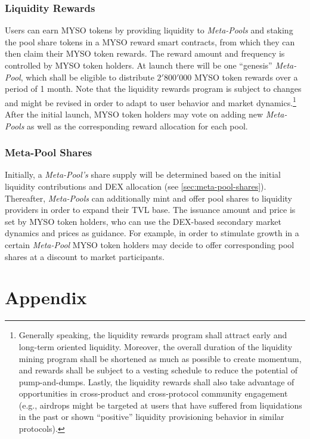 \documentclass[a4paper]{article}
\begin{document}
\subsubsection{Liquidity Rewards}
Users can earn MYSO tokens by providing liquidity to \emph{Meta-Pools} and staking the pool share tokens in a MYSO reward smart contracts, from which they can then claim their MYSO token rewards. The reward amount and frequency is controlled by MYSO token holders. At launch there will be one ``genesis'' \emph{Meta-Pool}, which shall be eligible to distribute $2'800'000$ MYSO token rewards over a period of 1 month. Note that the liquidity rewards program is subject to changes and might be revised in order to adapt to user behavior and market dynamics.\footnote{Generally speaking, the liquidity rewards program shall attract early and long-term oriented liquidity. Moreover, the overall duration of the liquidity mining program shall be shortened as much as possible to create momentum, and rewards shall be subject to a vesting schedule to reduce the potential of pump-and-dumps. Lastly, the liquidity rewards shall also take advantage of opportunities in cross-product and cross-protocol community engagement (e.g., airdrops might be targeted at users that have suffered from liquidations in the past or shown ``positive'' liquidity provisioning behavior in similar protocols).} After the initial launch, MYSO token holders may vote on adding new \emph{Meta-Pools} as well as the corresponding reward allocation for each pool.

\subsubsection{Meta-Pool Shares}
Initially, a \emph{Meta-Pool's} share supply will be determined based on the initial liquidity contributions and DEX allocation (see \cref{sec:meta-pool-shares}). Thereafter, \emph{Meta-Pools} can additionally mint and offer pool shares to liquidity providers in order to expand their TVL base. The issuance amount and price is set by MYSO token holders, who can use the DEX-based secondary market dynamics and prices as guidance. For example, in order to stimulate growth in a certain \emph{Meta-Pool} MYSO token holders may decide to offer corresponding pool shares at a discount to market participants.

\newpage
\appendix
\section{Appendix}
\end{document}

